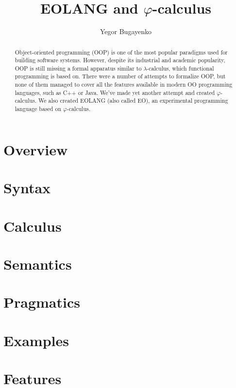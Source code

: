\documentclass[sigplan,nonacm=true]{acmart}
\title{EOLANG and $\varphi$-calculus}
\author{Yegor Bugayenko}{}{}
\affiliation{
  \institution{}
  \city{Moscow}
  \country{Russia}
}
\theoremstyle{theorems}
\newcommand\phic{{$\varphi$-calculus}}
\newcommand\eo{{\sffamily EO}}
\begin{document}
\begin{abstract}
Object-oriented programming (OOP) is one of the most popular
paradigms used for building software systems. However, despite
its industrial and academic popularity, OOP is still missing
a formal apparatus similar to $\lambda$-calculus, which functional
programming is based on. There were a number of attempts to formalize
OOP, but none of them managed to cover all the features available in
modern OO programming languages, such as C++ or Java.
We've made yet another attempt and created \phic{}. We also
created EOLANG (also called \eo{}), an experimental
programming language based on \phic{}.
\end{abstract}

\maketitle

\section{Overview}


\section{Syntax}
\label{sec:syntax}


\section{Calculus}
\label{sec:calculus}


\section{Semantics}
\label{sec:semantics}


\section{Pragmatics}
\label{sec:pragmatics}


\section{Examples}
\label{sec:examples}


\section{Features}
\label{sec:features}

\end{document}
